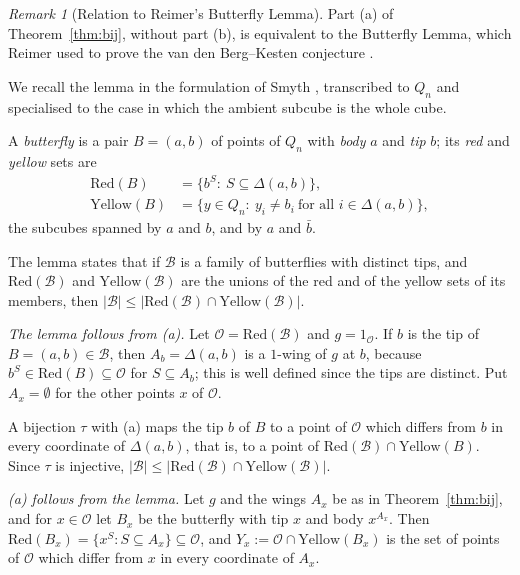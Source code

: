 \documentclass[11pt,reqno]{amsart}
\theoremstyle{definition}
\theoremstyle{remark}
\newtheorem{remark}[theorem]{Remark}
\numberwithin{equation}{section}
\theoremstyle{named}
\theoremstyle{plain}
\newcommand{\cO}{\mathcal{O}}
\newcommand{\abs}[1]{\lvert #1\rvert}
\begin{document}
\begin{remark}[Relation to Reimer's Butterfly Lemma]\label{rem:butterfly}
Part (a) of Theorem~\ref{thm:bij}, without part (b), is equivalent to the Butterfly Lemma, which
Reimer used to prove the van den Berg--Kesten conjecture \cite{Rei}.

We recall the lemma in the
formulation of Smyth \cite[Lemma~2.4]{Smy}, transcribed to
$Q_n$ and specialised to the case in which the ambient subcube is the whole cube.

A \emph{butterfly}
is a pair $B=(a,b)$ of points of $Q_n$ with \emph{body} $a$ and \emph{tip} $b$; its \emph{red} and
\emph{yellow} sets are
\begin{align*}
   \mathrm{Red}(B)&=\{b^{S}:\ S\subseteq\Delta(a,b)\},\\
   \mathrm{Yellow}(B)&=\{y\in Q_n:\ y_i\ne b_i\ \text{for all }i\in\Delta(a,b)\},
\end{align*}
the subcubes spanned by $a$ and $b$, and by $a$ and $\bar b$.

The lemma states that if
$\mathcal B$ is a family of butterflies with distinct tips, and $\mathrm{Red}(\mathcal B)$ and
$\mathrm{Yellow}(\mathcal B)$ are the unions of the red and of the yellow sets of its members, then
$\abs{\mathcal B}\le\abs{\mathrm{Red}(\mathcal B)\cap\mathrm{Yellow}(\mathcal B)}$.

\smallskip
\emph{The lemma follows from \textup{(a)}.} Let $\cO=\mathrm{Red}(\mathcal B)$ and $g=1_{\cO}$. If
$b$ is the tip of $B=(a,b)\in\mathcal B$, then $A_b=\Delta(a,b)$ is a $1$-wing of $g$ at $b$, because
$b^{S}\in\mathrm{Red}(B)\subseteq\cO$ for $S\subseteq A_b$; this is well defined since the tips are
distinct. Put $A_x=\emptyset$ for the other points $x$ of $\cO$.

A bijection $\tau$ with (a) maps
the tip $b$ of $B$ to a point of $\cO$ which differs from $b$ in every coordinate of $\Delta(a,b)$,
that is, to a point of $\mathrm{Red}(\mathcal B)\cap\mathrm{Yellow}(B)$. Since $\tau$ is injective,
$\abs{\mathcal B}\le\abs{\mathrm{Red}(\mathcal B)\cap\mathrm{Yellow}(\mathcal B)}$.

\smallskip
\emph{\textup{(a)} follows from the lemma.} Let $g$ and the wings $A_x$ be as in
Theorem~\ref{thm:bij}, and for $x\in\cO$ let $B_x$ be the butterfly with tip $x$ and body $x^{A_x}$.
Then $\mathrm{Red}(B_x)=\{x^{S}:S\subseteq A_x\}\subseteq\cO$, and
$Y_x:=\cO\cap\mathrm{Yellow}(B_x)$ is the set of points of $\cO$ which differ from $x$ in every
coordinate of $A_x$.


\end{remark}
\end{document}
